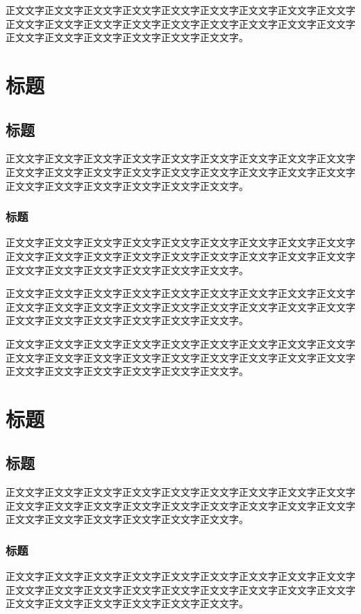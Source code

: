 \documentclass[
	StudentName     = 孙敬垚,
	StudentNameEng	= {{Name of Graduate (such as HAN Bao-cheng)}},
	AdvisorName     = {{冯兴杰 教授}},
	AdvisorNameEng	= {{Name of Supervisor and Title (such as Prof. FENG Chang-gen)}},
        AdvisorNameEngSecond = {{Name of Second Supervisor and Title}},
	StudentID		= XXXXX,
	Major           = ,
	ResearchInterest= ,
	Department		= XXXX学院,
	DepartmentEng	= {{Name of Department (or School)}},
	SubmitYear		= 202X,
	SubmitMonth		= X,
	SubmitDay		= XX,
	DefenseYear		= 202X,
	DefenseMonth	= X,
	DefenseDay		= XX,
	DefenseDateEng	= {{Date of Submit (such as April 2002)}},
	Title           = I2TDM,
	TitleEng        = {{English Title}},
	CLCNumber		= TD235,
	UDCNumber		= 624.152.5
]{cauc_thesis}
\begin{document}
正文文字正文文字正文文字正文文字正文文字正文文字正文文字正文文字正文文字正文文字正文文字正文文字正文文字正文文字正文文字正文文字正文文字正文文字正文文字正文文字正文文字正文文字正文文字正文文字。


{\centering\chapter{标题}}
\section{标题}
正文文字正文文字正文文字正文文字正文文字正文文字正文文字正文文字正文文字正文文字正文文字正文文字正文文字正文文字正文文字正文文字正文文字正文文字正文文字正文文字正文文字正文文字正文文字正文文字。

\subsection{标题}
正文文字正文文字正文文字正文文字正文文字正文文字正文文字正文文字正文文字正文文字正文文字正文文字正文文字正文文字正文文字正文文字正文文字正文文字正文文字正文文字正文文字正文文字正文文字正文文字。

正文文字正文文字正文文字正文文字正文文字正文文字正文文字正文文字正文文字正文文字正文文字正文文字正文文字正文文字正文文字正文文字正文文字正文文字正文文字正文文字正文文字正文文字正文文字正文文字。

正文文字正文文字正文文字正文文字正文文字正文文字正文文字正文文字正文文字正文文字正文文字正文文字正文文字正文文字正文文字正文文字正文文字正文文字正文文字正文文字正文文字正文文字正文文字正文文字。

{\centering\chapter{标题}}
\section{标题}
正文文字正文文字正文文字正文文字正文文字正文文字正文文字正文文字正文文字正文文字正文文字正文文字正文文字正文文字正文文字正文文字正文文字正文文字正文文字正文文字正文文字正文文字正文文字正文文字。

\subsection{标题}
正文文字正文文字正文文字正文文字正文文字正文文字正文文字正文文字正文文字正文文字正文文字正文文字正文文字正文文字正文文字正文文字正文文字正文文字正文文字正文文字正文文字正文文字正文文字正文文字。
\end{document}
